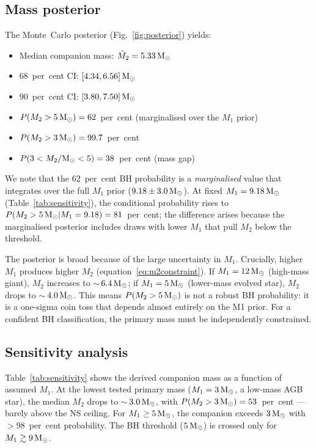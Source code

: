 \documentclass[usenatbib,fleqn]{mnras}
\newcommand{\Msun}{{\rm M}_\odot}
\begin{document}
\subsection{Mass posterior}
\label{sec:results:posterior}

The Monte~Carlo posterior (Fig.~\ref{fig:posterior}) yields:
\begin{itemize}
\item Median companion mass: $\tilde{M}_2 = 5.33\,\Msun$
\item 68~per~cent CI: $[4.34, 6.56]\,\Msun$
\item 90~per~cent CI: $[3.80, 7.50]\,\Msun$
\item $P(M_2 > 5\,\Msun) = 62$~per~cent
  (marginalised over the $M_1$ prior)
\item $P(M_2 > 3\,\Msun) = 99.7$~per~cent
\item $P(3 < M_2/\Msun < 5) = 38$~per~cent (mass gap)
\end{itemize}

We note that the 62~per~cent BH probability is a
\emph{marginalised} value that integrates over the full $M_1$
prior ($9.18 \pm 3.0\,\Msun$).  At fixed
$M_1 = 9.18\,\Msun$ (Table~\ref{tab:sensitivity}), the
conditional probability rises to
$P(M_2 > 5\,\Msun | M_1 = 9.18) = 81$~per~cent;
the difference arises because the marginalised posterior includes
draws with lower $M_1$ that pull $M_2$ below the threshold.

The posterior is broad because of the large uncertainty in $M_1$.
Crucially, higher $M_1$ produces higher $M_2$ (equation~\ref{eq:m2constraint}).
If $M_1 = 12\,\Msun$ (high-mass giant), $M_2$ increases to
$\sim$\,$6.4\,\Msun$; if $M_1 = 5\,\Msun$ (lower-mass evolved
star), $M_2$ drops to $\sim$\,$4.0\,\Msun$.
This means $P(M_2 > 5\,\Msun)$ is not
a robust BH probability: it is a one-sigma coin toss that depends
almost entirely on the M1 prior.  For a confident BH
classification, the primary mass must be independently constrained.

\subsection{Sensitivity analysis}
\label{sec:results:sensitivity}

Table~\ref{tab:sensitivity} shows the derived companion mass as a
function of assumed $M_1$.  At the lowest tested primary mass
($M_1 = 3\,\Msun$, a low-mass AGB star), the median $M_2$ drops
to $\sim$\,$3.0\,\Msun$, with $P(M_2 > 3\,\Msun) = 53$~per~cent
--- barely above the NS ceiling.  For
$M_1 \geq 5\,\Msun$, the companion exceeds $3\,\Msun$ with
$>98$~per~cent probability.  The BH threshold ($5\,\Msun$) is
crossed only for $M_1 \gtrsim 9\,\Msun$.
\end{document}
